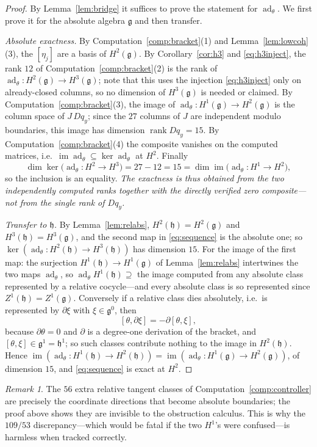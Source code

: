 \documentclass[11pt]{article}
\theoremstyle{definition}
\theoremstyle{remark}
\newtheorem{remark}[theorem]{Remark}
\newcommand{\im}{\operatorname{im}}
\newcommand{\rank}{\operatorname{rank}}
\newcommand{\ad}{\operatorname{ad}}
\newcommand{\g}{\mathfrak g}
\newcommand{\h}{\mathfrak h}
\begin{document}
\begin{proof}
By Lemma~\ref{lem:bridge} it suffices to prove the statement for
$\ad_\theta$.  We first prove it for the absolute algebra $\g$ and then
transfer.

\emph{Absolute exactness.}
By Computation~\ref{comp:bracket}(1) and Lemma~\ref{lem:lowcoh}(3), the
$[\eta_j]$ are a basis of $H^2(\g)$.  By Corollary~\ref{cor:h3} and
\eqref{eq:h3inject}, the rank $12$ of Computation~\ref{comp:bracket}(2) is
the rank of $\ad_\theta:H^2(\g)\to H^3(\g)$; note that this uses the
injection \eqref{eq:h3inject} only on already-closed columns, so no
dimension of $H^3(\g)$ is needed or claimed.  By
Computation~\ref{comp:bracket}(3), the image of
$\ad_\theta:H^1(\g)\to H^2(\g)$ is the column space of $J\,Dq_y$; since the
$27$ columns of $J$ are independent modulo boundaries, this image has
dimension $\rank Dq_y=15$.  By Computation~\ref{comp:bracket}(4) the
composite vanishes on the computed matrices, i.e.\
$\im\ad_\theta\subseteq\ker\ad_\theta$ at $H^2$.  Finally
\[
 \dim\ker\bigl(\ad_\theta:H^2\to H^3\bigr)=27-12=15
 =\dim\im\bigl(\ad_\theta:H^1\to H^2\bigr),
\]
so the inclusion is an equality.  \emph{The exactness is thus obtained from
the two independently computed ranks together with the directly verified
zero composite---not from the single rank of $Dq_y$.}

\emph{Transfer to $\h$.}  By Lemma~\ref{lem:relabs},
$H^2(\h)=H^2(\g)$ and $H^3(\h)=H^3(\g)$, and the second map in
\eqref{eq:sequence} is the absolute one; so
$\ker(\ad_\theta:H^2(\h)\to H^3(\h))$ has dimension $15$.  For the image of
the first map: the surjection $H^1(\h)\to H^1(\g)$ of
Lemma~\ref{lem:relabs} intertwines the two maps $\ad_\theta$, so
$\ad_\theta H^1(\h)\supseteq$ the image computed from any absolute class
represented by a relative cocycle---and every absolute class is so
represented since $Z^1(\h)=Z^1(\g)$.  Conversely if a relative class dies
absolutely, i.e.\ is represented by $\partial\xi$ with $\xi\in\g^0$, then
\[
 [\theta,\partial\xi]=-\partial[\theta,\xi],
\]
because $\partial\theta=0$ and $\partial$ is a degree-one derivation of the
bracket, and $[\theta,\xi]\in\g^1=\h^1$; so such classes contribute nothing
to the image in $H^2(\h)$.  Hence
$\im(\ad_\theta:H^1(\h)\to H^2(\h))
=\im(\ad_\theta:H^1(\g)\to H^2(\g))$, of dimension $15$, and
\eqref{eq:sequence} is exact at $H^2$.
\end{proof}

\begin{remark}
The $56$ extra relative tangent classes of
Computation~\ref{comp:controller} are precisely the coordinate directions
that become absolute boundaries; the proof above shows they are invisible
to the obstruction calculus.  This is why the $109/53$ discrepancy---which
would be fatal if the two $H^1$'s were confused---is harmless when tracked
correctly.
\end{remark}
\end{document}
